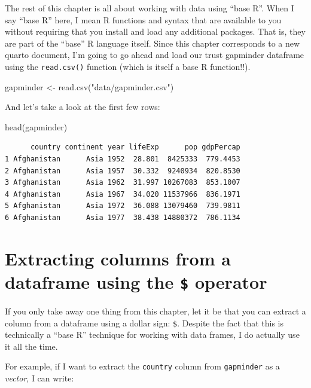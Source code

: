 \documentclass[
  letterpaper,
  DIV=11,
  numbers=noendperiod]{scrreprt}
\newenvironment{Shaded}{\begin{snugshade}}{\end{snugshade}}
\newcommand{\FunctionTok}[1]{\textcolor[rgb]{0.28,0.35,0.67}{#1}}
\newcommand{\NormalTok}[1]{\textcolor[rgb]{0.00,0.23,0.31}{#1}}
\newcommand{\OtherTok}[1]{\textcolor[rgb]{0.00,0.23,0.31}{#1}}
\newcommand{\StringTok}[1]{\textcolor[rgb]{0.13,0.47,0.30}{#1}}
\begin{document}
The rest of this chapter is all about working with data using ``base
R''. When I say ``base R'' here, I mean R functions and syntax that are
available to you without requiring that you install and load any
additional packages. That is, they are part of the ``base'' R language
itself. Since this chapter corresponds to a new quarto document, I'm
going to go ahead and load our trust gapminder dataframe using the
\texttt{read.csv()} function (which is itself a base R function!!).

\begin{Shaded}
\begin{Highlighting}[]
\NormalTok{gapminder }\OtherTok{\textless{}{-}} \FunctionTok{read.csv}\NormalTok{(}\StringTok{"data/gapminder.csv"}\NormalTok{)}
\end{Highlighting}
\end{Shaded}

And let's take a look at the first few rows:

\begin{Shaded}
\begin{Highlighting}[]
\FunctionTok{head}\NormalTok{(gapminder)}
\end{Highlighting}
\end{Shaded}

\begin{verbatim}
      country continent year lifeExp      pop gdpPercap
1 Afghanistan      Asia 1952  28.801  8425333  779.4453
2 Afghanistan      Asia 1957  30.332  9240934  820.8530
3 Afghanistan      Asia 1962  31.997 10267083  853.1007
4 Afghanistan      Asia 1967  34.020 11537966  836.1971
5 Afghanistan      Asia 1972  36.088 13079460  739.9811
6 Afghanistan      Asia 1977  38.438 14880372  786.1134
\end{verbatim}

\section{\texorpdfstring{Extracting columns from a dataframe using the
\texttt{\$}
operator}{Extracting columns from a dataframe using the \$ operator}}\label{extracting-columns-from-a-dataframe-using-the-operator}

If you only take away one thing from this chapter, let it be that you
can extract a column from a dataframe using a dollar sign: \texttt{\$}.
Despite the fact that this is technically a ``base R'' technique for
working with data frames, I do actually use it all the time.

For example, if I want to extract the \texttt{country} column from
\texttt{gapminder} as a \emph{vector}, I can write:
\end{document}
